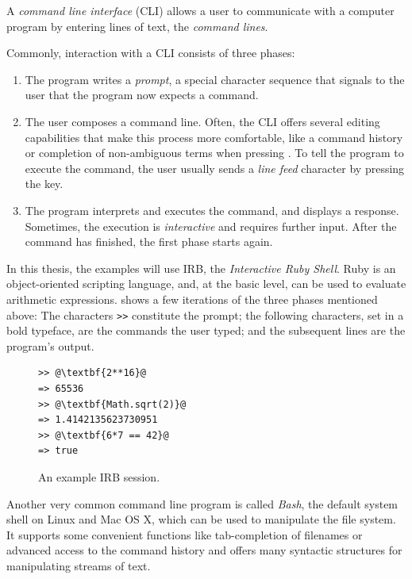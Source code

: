 \documentclass[paper=a4,twoside,abstract=on,cleardoublepage=empty,numbers=noenddot,toc=bib,toc=listof,12pt,appendixprefix=true]{scrreprt}
\begin{document}
A \emph{command line interface} (\textsc{CLI}) allows a user to communicate with a computer program by entering lines of text, the \emph{command lines}.

Commonly, interaction with a \textsc{CLI} consists of three phases:

\begin{enumerate}
    \item The program writes a \emph{prompt}, a special character sequence that signals to the user that the program now expects a command.
    \item The user composes a command line. Often, the CLI offers several editing capabilities that make this process more comfortable, like a command history or completion of non-ambiguous terms when pressing . To tell the program to execute the command, the user usually sends a \emph{line feed} character by pressing the  key.
    \item The program interprets and executes the command, and displays a response. Sometimes, the execution is \emph{interactive} and requires further input. After the command has finished, the first phase starts again.
\end{enumerate}

In this thesis, the examples will use IRB, the \emph{Interactive Ruby Shell}. Ruby is an object-oriented scripting language, and, at the basic level, can be used to evaluate arithmetic expressions.  shows a few iterations of the three phases mentioned above: The characters \texttt{>\->} constitute the prompt; the following characters, set in a bold typeface, are the commands the user typed; and the subsequent lines are the program's output.

\begin{figure}[tb]
    \begin{lstlisting}[escapechar=@,frame=shadowbox]
>> @\textbf{2**16}@
=> 65536
>> @\textbf{Math.sqrt(2)}@
=> 1.4142135623730951
>> @\textbf{6*7 == 42}@
=> true
    \end{lstlisting}
    \centering
    \caption{An example IRB session.}
    \label{fig:irb}
\end{figure}

\label{sec:cliexamples}

Another very common command line program is called \emph{Bash}, the default system shell on Linux and Mac OS X, which can be used to manipulate the file system. It supports some convenient functions like tab-completion of filenames or advanced access to the command history and offers many syntactic structures for manipulating streams of text.
\end{document}
